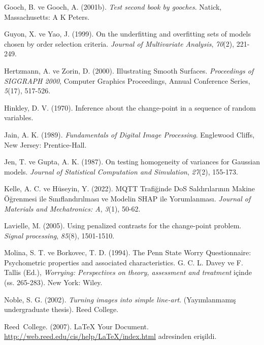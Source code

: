 \documentclass[12pt,twoside]{deuthesis}
\begin{document}
\begin{CSLReferences}{1}{0}
\leavevmode{}%
Gooch, B. ve Gooch, A. (2001b). \emph{Test second book by gooches}. Natick, Massachusetts: A K Peters.

\leavevmode{}%
Guyon, X. ve Yao, J. (1999). On the underfitting and overfitting sets of models chosen by order selection criteria. \emph{Journal of Multivariate Analysis}, \emph{70}(2), 221-249.

\leavevmode{}%
Hertzmann, A. ve Zorin, D. (2000). Illustrating Smooth Surfaces. \emph{Proceedings of SIGGRAPH 2000}, Computer Graphics Proceedings, Annual Conference Series, \emph{5}(17), 517-526.

\leavevmode{}%
Hinkley, D. V. (1970). Inference about the change-point in a sequence of random variables.

\leavevmode{}%
Jain, A. K. (1989). \emph{Fundamentals of Digital Image Processing}. Englewood Cliffs, New Jersey: Prentice-Hall.

\leavevmode{}%
Jen, T. ve Gupta, A. K. (1987). On testing homogeneity of variances for Gaussian models. \emph{Journal of Statistical Computation and Simulation}, \emph{27}(2), 155-173.

\leavevmode{}%
Kelle, A. C. ve Hüseyin, Y. (2022). MQTT Trafi{ğ}inde DoS Sald{ı}r{ı}lar{ı}n{ı}n Makine {Ö}{ğ}renmesi ile S{ı}n{ı}fland{ı}r{ı}lmas{ı} ve Modelin SHAP ile Yorumlanmas{ı}. \emph{Journal of Materials and Mechatronics: A}, \emph{3}(1), 50-62.

\leavevmode{}%
Lavielle, M. (2005). Using penalized contrasts for the change-point problem. \emph{Signal processing}, \emph{85}(8), 1501-1510.

\leavevmode{}%
Molina, S. T. ve Borkovec, T. D. (1994). The {P}enn {S}tate Worry Questionnaire: Psychometric properties and associated characteristics. G. C. L. Davey ve F. Tallis (Ed.), \emph{Worrying: Perspectives on theory, assessment and treatment} içinde (ss. 265-283). New York: Wiley.

\leavevmode{}%
Noble, S. G. (2002). \emph{Turning images into simple line-art}. (Yayımlanmamış undergraduate thesis). Reed College.

\leavevmode{}%
Reed~College. (2007). LaTeX Your Document. \url{http://web.reed.edu/cis/help/LaTeX/index.html} adresinden erişildi.


\end{CSLReferences}
\end{document}
